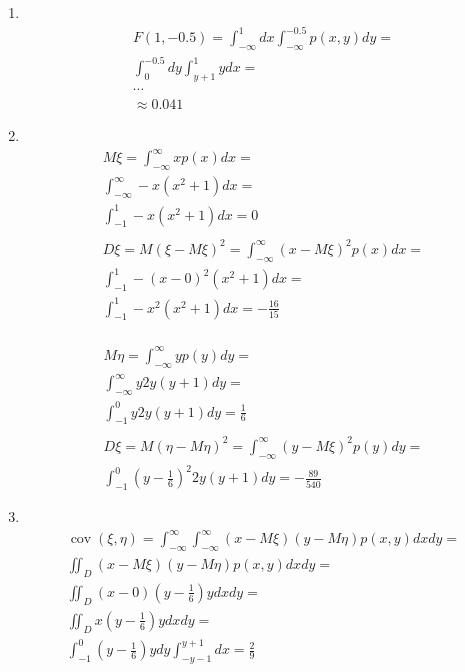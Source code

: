 \documentclass[12pt]{article}
\DeclareMathOperator{\cov}{cov}
\begin{document}
\begin{enumerate}
	\item \mbox{}\\
	      \begin{gather*}
		      F(1,-0.5) = \int_{-\infty}^{1}dx\int_{-\infty}^{-0.5}p(x,y)dy = \\
		      \int_{0}^{-0.5}dy\int_{y+1}^{1}ydx = \\
		      \cdots \\
		      \approx 0.041
	      \end{gather*}

	\item \mbox{}\\
	      \begin{gather*}
		      M\xi = \int_{-\infty}^{\infty}xp(x)dx = \\
		      \int_{-\infty}^{\infty}-x(x^2 + 1)dx = \\
		      \int_{-1}^{1}-x(x^2+1)dx = 0 \\
		      \\
		      D\xi = M(\xi - M\xi)^2 = \int_{-\infty}^{\infty}(x - M\xi)^2p(x)dx = \\
		      \int_{-1}^{1}-(x - 0)^2(x^2 + 1)dx = \\
		      \int_{-1}^{1}-x^2(x^2+1)dx = -\frac{16}{15}\\
	      \end{gather*}

	      \begin{gather*}
		      M\eta = \int_{-\infty}^{\infty}yp(y)dy = \\
		      \int_{-\infty}^{\infty}y2y(y + 1)dy = \\
		      \int_{-1}^{0}y2y(y+1)dy = \frac{1}{6} \\
		      \\
		      D\xi = M(\eta - M\eta)^2 = \int_{-\infty}^{\infty}(y - M\xi)^2p(y)dy = \\
		      \int_{-1}^{0}(y - \frac{1}{6})^2 2y(y + 1) dy = -\frac{89}{540}
	      \end{gather*}

	\item \mbox{}\\
	      \begin{gather*}
		      \cov(\xi, \eta) = \int_{-\infty}^{\infty}\int_{-\infty}^{\infty}(x - M\xi)(y - M\eta)p(x, y)dxdy = \\
		      \iint_{D}(x - M\xi)(y - M\eta)p(x, y)dxdy = \\
		      \iint_{D}(x - 0)(y - \frac{1}{6})ydxdy = \\
		      \iint_{D}x(y - \frac{1}{6})ydxdy = \\
		      \int_{-1}^{0}(y - \frac{1}{6})ydy\int_{-y-1}^{y+1}dx = \frac{2}{9}\\
	      \end{gather*}


\end{enumerate}
\end{document}
